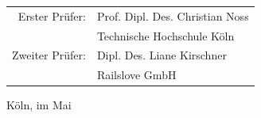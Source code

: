 \begin{titlepage}
\begin{center}
\vspace{1.0cm}

\begin{tabular}{rl}
        Erster Prüfer:  &  Prof. Dipl. Des. Christian Noss\\
       					&  \small Technische Hochschule Köln \\[1.0em]
       Zweiter Prüfer:  &  Dipl. Des. Liane Kirschner\\
       					&  \small Railslove GmbH\\
\end{tabular}

\vspace{0.6cm}

\begin{large}
Köln, im Mai \the\year
\end{large}

\end{center}

\end{titlepage}
